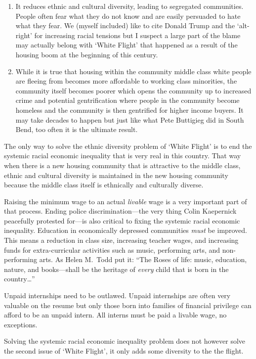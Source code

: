 \begin{enumerate}
  \item It reduces ethnic and cultural diversity, leading to segregated communities. People often fear what they do not know and are easily persuaded to hate what they fear. We (myself included) like to cite Donald Trump and the `alt-right' for increasing racial tensions but I suspect a large part of the blame may actually belong with `White Flight' that happened as a result of the housing boom at the beginning of this century.
  \item While it is true that housing within the community middle class white people are fleeing from becomes more affordable to working class minorities, the community itself becomes poorer which opens the community up to increased crime and potential gentrification where people in the community become homeless and the community is then gentrified for higher income buyers. It may take decades to happen but just like what Pete Buttigieg did in South Bend, too often it is the ultimate result.
\end{enumerate}

The only way to solve the ethnic diversity problem of `White Flight' is to end the systemic racial economic inequality that is very real in this country. That way when there is a new housing community that is attractive to the middle class, ethnic and cultural diversity is maintained in the new housing community because the middle class itself is ethnically and culturally diverse.

Raising the minimum wage to an actual \emph{livable} wage is a very important part of that process. Ending police discrimination---the very thing Colin Kaepernick peacefully protested for---is also critical to fixing the systemic racial economic inequality. Education in economically depressed communities \emph{must} be improved. This means a reduction in class size, increasing teacher wages, and increasing funds for extra-curricular activities such as music, performing arts, and non-performing arts. As Helen M.\ Todd put it: ``The Roses of life: music, education, nature, and books---shall be the heritage of \emph{every} child that is born in the country\ldots{}''

Unpaid internships need to be outlawed. Unpaid internships are often very valuable on the resume but only those born into families of financial privilege can afford to be an unpaid intern. All interns must be paid a livable wage, no exceptions.

Solving the systemic racial economic inequality problem does not however solve the second issue of `White Flight', it only adds some diversity to the the flight.

